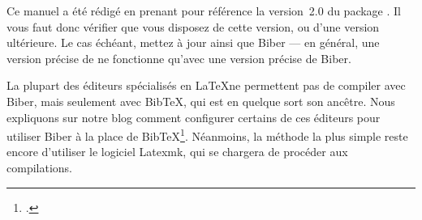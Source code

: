 \begin{attention}
Ce manuel a été rédigé en prenant pour référence la version~2.0 du package . Il vous faut donc vérifier que vous disposez de cette version, ou d'une version ultérieure. Le cas échéant, mettez à jour  ainsi que Biber --- en général, une version précise de  ne fonctionne qu'avec une version précise de Biber.
\end{attention}

\begin{attention}
La plupart des éditeurs spécialisés en \LaTeX ne permettent pas de compiler avec Biber, mais seulement avec BibTeX, qui est en quelque sort son ancêtre. Nous expliquons sur notre blog comment configurer certains de ces éditeurs pour utiliser Biber à la place de BibTeX\footcite{biber_logiciels}. Néanmoins, la méthode la plus simple reste encore d'utiliser le logiciel Latexmk, qui se chargera de procéder aux compilations.
\end{attention}






